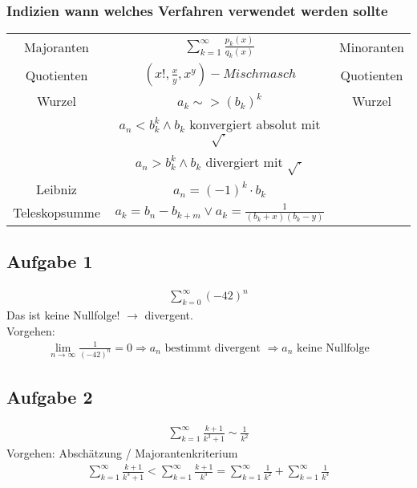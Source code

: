 \subsubsection{Indizien wann welches Verfahren verwendet werden sollte}
\begin{center}
    \begin{tabular}{ccc}
        Majoranten & $\sum_{k=1}^{\infty} \frac{p_k(x)}{q_k(x)}$ & Minoranten\\
        Quotienten & $(x!, \frac{x}{y}, x^y)-Mischmasch$ & Quotienten\\
        Wurzel & $a_k \sim> (b_k)^k$ & Wurzel\\
        & $a_n < b_{k}^k \land b_k$ konvergiert absolut mit $\sqrt{\cdot}$ & \\
        & $a_n > b_{k}^k \land b_k$ divergiert mit $\sqrt{\cdot}$ & \\
        Leibniz & $a_n = (-1)^k \cdot b_k$\\
        Teleskopsumme & $a_k = b_n - b_{k + m} \lor a_k = \frac{1}{(b_k + x) (b_k - y)}$
    \end{tabular}
\end{center}

\subsection{Aufgabe 1}
\begin{align*}
    \sum_{k=0}^{\infty} (-42)^n
\end{align*}
Das ist keine Nullfolge! $\rightarrow$ divergent.\\
Vorgehen:
\begin{align*}
    \underset{n \rightarrow \infty}{\lim} \frac{1}{(-42)^n} = 0 \Rightarrow a_n \text{ bestimmt divergent } \Rightarrow a_n \text{ keine Nullfolge}
\end{align*}
\subsection{Aufgabe 2}
\begin{align*}
    \sum_{k=1}^{\infty} \frac{k + 1}{k^3 + 1} \sim \frac{1}{k^2}
\end{align*}
Vorgehen: Abschätzung / Majorantenkriterium
\begin{align*}
    \sum_{k=1}^{\infty} \frac{k +1}{k^3 +1} < \sum_{k=1}^{\infty} \frac{k+1}{k^3} = \sum_{k=1}^{\infty} \frac{1}{k^2} + \sum_{k=1}^{\infty} \frac{1}{k^3}
\end{align*}
